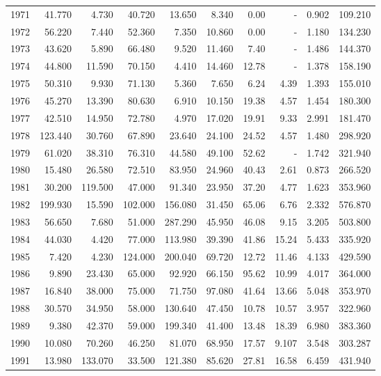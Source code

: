 \documentclass[
]{scrartcl}
\begin{document}
\begin{landscape}
\begin{longtable}{rrrrrrrrrr}
1971 & 41.770 & 4.730 & 40.720 & 13.650 & 8.340 & 0.00 &  -  & 0.902 & 109.210 \\ 
1972 & 56.220 & 7.440 & 52.360 & 7.350 & 10.860 & 0.00 &  -  & 1.180 & 134.230 \\ 
1973 & 43.620 & 5.890 & 66.480 & 9.520 & 11.460 & 7.40 &  -  & 1.486 & 144.370 \\ 
1974 & 44.800 & 11.590 & 70.150 & 4.410 & 14.460 & 12.78 &  -  & 1.378 & 158.190 \\ 
1975 & 50.310 & 9.930 & 71.130 & 5.360 & 7.650 & 6.24 & 4.39 & 1.393 & 155.010 \\ 
1976 & 45.270 & 13.390 & 80.630 & 6.910 & 10.150 & 19.38 & 4.57 & 1.454 & 180.300 \\ 
1977 & 42.510 & 14.950 & 72.780 & 4.970 & 17.020 & 19.91 & 9.33 & 2.991 & 181.470 \\ 
1978 & 123.440 & 30.760 & 67.890 & 23.640 & 24.100 & 24.52 & 4.57 & 1.480 & 298.920 \\ 
1979 & 61.020 & 38.310 & 76.310 & 44.580 & 49.100 & 52.62 &  -  & 1.742 & 321.940 \\ 
1980 & 15.480 & 26.580 & 72.510 & 83.950 & 24.960 & 40.43 & 2.61 & 0.873 & 266.520 \\ 
1981 & 30.200 & 119.500 & 47.000 & 91.340 & 23.950 & 37.20 & 4.77 & 1.623 & 353.960 \\ 
1982 & 199.930 & 15.590 & 102.000 & 156.080 & 31.450 & 65.06 & 6.76 & 2.332 & 576.870 \\ 
1983 & 56.650 & 7.680 & 51.000 & 287.290 & 45.950 & 46.08 & 9.15 & 3.205 & 503.800 \\ 
1984 & 44.030 & 4.420 & 77.000 & 113.980 & 39.390 & 41.86 & 15.24 & 5.433 & 335.920 \\ 
1985 & 7.420 & 4.230 & 124.000 & 200.040 & 69.720 & 12.72 & 11.46 & 4.133 & 429.590 \\ 
1986 & 9.890 & 23.430 & 65.000 & 92.920 & 66.150 & 95.62 & 10.99 & 4.017 & 364.000 \\ 
1987 & 16.840 & 38.000 & 75.000 & 71.750 & 97.080 & 41.64 & 13.66 & 5.048 & 353.970 \\ 
1988 & 30.570 & 34.950 & 58.000 & 130.640 & 47.450 & 10.78 & 10.57 & 3.957 & 322.960 \\ 
1989 & 9.380 & 42.370 & 59.000 & 199.340 & 41.400 & 13.48 & 18.39 & 6.980 & 383.360 \\ 
1990 & 10.080 & 70.260 & 46.250 & 81.070 & 68.950 & 17.57 & 9.107 & 3.548 & 303.287 \\ 
1991 & 13.980 & 133.070 & 33.500 & 121.380 & 85.620 & 27.81 & 16.58 & 6.459 & 431.940 \\ 

\end{longtable}
\end{landscape}
\end{document}
